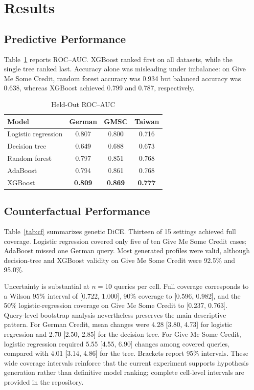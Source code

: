 \documentclass[conference]{IEEEtran}
\begin{document}
\section{Results}
\subsection{Predictive Performance}
Table~\ref{tab:auc} reports ROC--AUC. XGBoost ranked first on all datasets, while the single tree ranked last. Accuracy alone was misleading under imbalance: on Give Me Some Credit, random forest accuracy was 0.934 but balanced accuracy was 0.638, whereas XGBoost achieved 0.799 and 0.787, respectively.

\begin{table}[t]
\caption{Held-Out ROC--AUC}
\label{tab:auc}
\centering\small
\begin{tabular}{lccc}
\toprule Model & German & GMSC & Taiwan \\
\midrule
Logistic regression & 0.807 & 0.800 & 0.716 \\
Decision tree & 0.649 & 0.688 & 0.673 \\
Random forest & 0.797 & 0.851 & 0.768 \\
AdaBoost & 0.794 & 0.861 & 0.768 \\
XGBoost & \textbf{0.809} & \textbf{0.869} & \textbf{0.777} \\
\bottomrule
\end{tabular}
\end{table}

\subsection{Counterfactual Performance}
Table~\ref{tab:cf} summarizes genetic DiCE. Thirteen of 15 settings achieved full coverage. Logistic regression covered only five of ten Give Me Some Credit cases; AdaBoost missed one German query. Most generated profiles were valid, although decision-tree and XGBoost validity on Give Me Some Credit were 92.5\% and 95.0\%.

Uncertainty is substantial at $n=10$ queries per cell. Full coverage corresponds to a Wilson 95\% interval of [0.722, 1.000], 90\% coverage to [0.596, 0.982], and the 50\% logistic-regression coverage on Give Me Some Credit to [0.237, 0.763]. Query-level bootstrap analysis nevertheless preserves the main descriptive pattern. For German Credit, mean changes were 4.28 [3.80, 4.73] for logistic regression and 2.70 [2.50, 2.85] for the decision tree. For Give Me Some Credit, logistic regression required 5.55 [4.55, 6.90] changes among covered queries, compared with 4.01 [3.14, 4.86] for the tree. Brackets report 95\% intervals. These wide coverage intervals reinforce that the current experiment supports hypothesis generation rather than definitive model ranking; complete cell-level intervals are provided in the repository.
\end{document}
